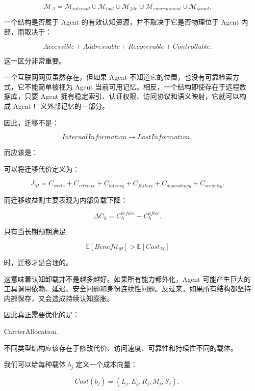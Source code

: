 \[
\mathcal M_A
=
\mathcal M_{internal}
\cup
\mathcal M_{tool}
\cup
\mathcal M_{file}
\cup
\mathcal M_{environment}
\cup
\mathcal M_{social}.
\]

一个结构是否属于 Agent 的有效认知资源，并不取决于它是否物理位于 Agent 内部，而取决于：

\[
\boxed{
Accessible
+
Addressable
+
Recoverable
+
Controllable.
}
\]

这一区分非常重要。

一个互联网网页虽然存在，但如果 Agent 不知道它的位置，也没有可靠检索方式，它不能简单被视为 Agent 当前可用记忆。相反，一个结构即使存在于远程数据库，只要 Agent 拥有稳定索引、认证权限、访问协议和语义映射，它就可以构成 Agent 广义外部记忆的一部分。

因此，迁移不是：

\[
InternalInformation
\rightarrow
LostInformation,
\]

而应该是：

\begin{statementbox}
\centering
{}
\end{statementbox}

可以将迁移代价定义为：

\[
J_M
=
C_{write}
+
C_{retrieve}
+
C_{latency}
+
C_{failure}
+
C_{dependency}
+
C_{security}.
\]

而迁移收益则主要表现为内部负载下降：

\[
\Delta C_h
=
C_h^{before}
-
C_h^{after}.
\]

只有当长期预期满足

\[
\mathbb E
[
Benefit_M
]
>
\mathbb E
[
Cost_M
]
\]

时，迁移才是合理的。

这意味着认知卸载并不是越多越好。如果所有能力都外化，Agent 可能产生巨大的工具调用依赖、延迟、安全问题和身份连续性问题。反过来，如果所有结构都坚持内部保存，又会造成持续认知膨胀。

因此真正需要优化的是：

\begin{statementbox}
CarrierAllocation.
\end{statementbox}

不同类型结构应该存在于修改代价、访问速度、可靠性和持续性不同的载体。

我们可以给每种载体 $b_j$ 定义一个成本向量：

\[
Cost(b_j)
=
(
L_j,
E_j,
R_j,
M_j,
S_j
),
\]

